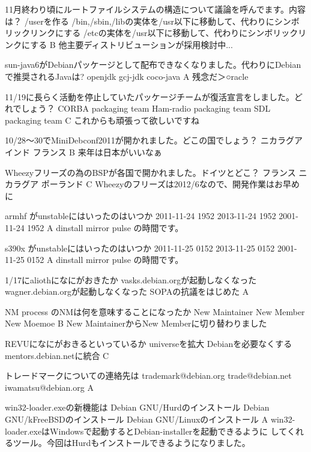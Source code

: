 %

\santaku
{11月終わり頃にルートファイルシステムの構造について議論を呼んでます。内容は？}
{/userを作る}
{/bin,/sbin,/libの実体を/usr以下に移動して、代わりにシンボリックリンクにする}
{/etcの実体を/usr以下に移動して、代わりにシンボリックリンクにする}
{B}
{他主要ディストリビューションが採用検討中...}

\santaku
{sun-java6がDebianパッケージとして配布できなくなりました。代わりにDebianで推奨されるJavaは?}
{openjdk}
{gcj-jdk}
{coco-java}
{A}
{残念だ＞○racle}

\santaku
{11/19に長らく活動を停止していたパッケージチームが復活宣言をしました。どれでしょう？}
{CORBA packaging team}
{Ham-radio packaging team}
{SDL packaging team}
{C}
{これからも頑張って欲しいですね}

\santaku
{10/28〜30でMiniDebconf2011が開かれました。どこの国でしょう？}
{ニカラグア}
{インド}
{フランス}
{B}
{来年は日本がいいなぁ}

\santaku
{Wheezyフリーズの為のBSPが各国で開かれました。ドイツとどこ？}
{フランス}
{ニカラグア}
{ポーランド}
{C}
{Wheezyのフリーズは2012/6なので、開発作業はお早めに}

\santaku
{armhf がunstableにはいったのはいつか}
{2011-11-24 1952}
{2013-11-24 1952}
{2001-11-24 1952}
{A}
{dinstall mirror pulse の時間です。}

\santaku
{s390x がunstableにはいったのはいつか}
{2011-11-25 0152}
{2013-11-25 0152}
{2001-11-25 0152}
{A}
{dinstall mirror pulse の時間です。}

\santaku
{1/17にaliothになにがおきたか}
{vasks.debian.orgが起動しなくなった}
{wagner.debian.orgが起動しなくなった}
{SOPAの抗議をはじめた}
{A}
{}

\santaku
{NM process のNMは何を意味することになったか}
{New Maintainer}
{New Member}
{New Moemoe}
{B}
{New MaintainerからNew Memberに切り替わりました}

\santaku
{REVUになにがおきるといっているか}
{universeを拡大}
{Debianを必要なくする}
{mentors.debian.netに統合}
{C}
{}

\santaku
{トレードマークについての連絡先は}
{trademark@debian.org}
{trade@debian.net}
{iwamatsu@debian.org}
{A}
{}

\santaku
{win32-loader.exeの新機能は}
{Debian GNU/Hurdのインストール}
{Debian GNU/kFreeBSDのインストール}
{Debian GNU/Linuxのインストール}
{A}
{win32-loader.exeはWindowsで起動するとDebian-installerを起動できるように
してくれるツール。今回はHurdもインストールできるようになりました。}

